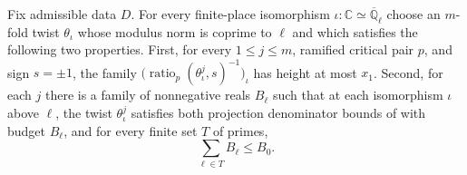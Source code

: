\begin{lemma}
\label{lem:c-regular-family}
\emitthmsource
Fix admissible data $D$. For every finite-place isomorphism $\iota:\mathbb C\simeq\overline{\mathbb Q}_\ell$ choose an $m$-fold twist $\theta_\iota$ whose modulus norm is coprime to $\ell$ and which satisfies the following two properties.
First, for every $1\le j\le m$, ramified critical pair $p$, and sign $s=\pm1$, the family $\bigl(\operatorname{ratio}_p(\theta_\iota^j,s)^{-1}\bigr)_\iota$ has height at most $x_1$.
Second, for each $j$ there is a family of nonnegative reals $B_\ell$ such that at each isomorphism $\iota$ above $\ell$, the twist $\theta_\iota^j$ satisfies both projection denominator bounds of  with budget $B_\ell$, and for every finite set $T$ of primes,
\[
 \sum_{\ell\in T}B_\ell
 \le B_0.
\]
\end{lemma}
